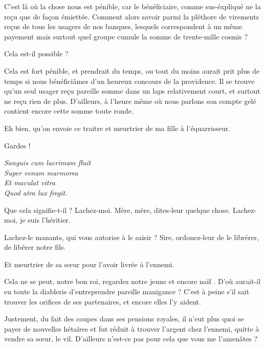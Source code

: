 \begin{drama}
  \impositeurspeaks C’est là où la chose nous est pénible, car le bénéficiaire, comme sus-éxpliqué ne la reçu que de façon émiettée. Comment alors savoir parmi la pléthore de virements reçus de tous les usagers de nos banques, lesquels correspondent à un même payement mais surtout quel groupe cumule la somme de trente-mille cosmis ?

  \roispeaks Cela est-il possible ?

  \impositeurspeaks Cela est fort pénible, et prendrait du temps, ou tout du moins aurait prit plus de temps si nous bénéficiâmes d’un heureux concours de la providence. Il se trouve qu’un seul usager reçu pareille somme dans un laps relativement court, et surtout ne reçu rien de plus. D’ailleurs, à l’heure même où nous parlons son compte gelé contient encore cette somme toute ronde.

  \reinespeaks Eh bien, qu’on envoie ce traitre et meurtrier de ma fille à l’équarrisseur.

  \roispeaks Gardes !


  \choirspeaks
  \begin{minipage}[t]{\linewidth}
    \em
    Sanguis cum lacrimam fluit\endnote{\lacrimamendnote}\\
    Super venam marmorea\\
    Et maculat vitra\\
    Quod atra lux fregit.
  \end{minipage}

  \vladimirspeaks Que cela signifie-t-il ? Lachez-moi.  Mère, mère, dites-leur quelque chose. Lachez-moi, je suis l’héritier.


  \reinespeaks {} Lachez-le manants, qui vous autorise à le saisir ?  Sire, ordonez-leur de le librérer, de libérer notre fils.

  \roispeaks Et meurtrier de sa sœur pour l’avoir livrée à l’ennemi.

  \reinespeaks Cela ne se peut, notre bon roi, regardez notre jeune et encore naïf \vladimir{}. D’où aurait-il eu toute la diablerie d’entreprendre pareille manigance ? C’est à peine s’il sait trouver les orifices de ses partenaires, et encore elles l’y aident.

  \roispeaks Justement, du fait des coupes dans ses pensions royales, il n’eut plus quoi se payer de nouvelles hétaïres et fut réduit à trouver l’argent chez l’ennemi, quitte à vendre sa sœur, le vil. D’ailleurs n’est-ce pas pour cela que vous me l’amenâtes ?


\end{drama}
